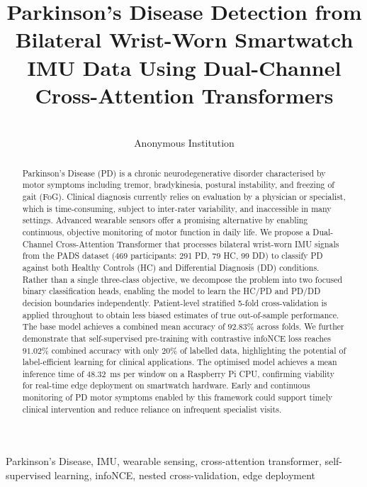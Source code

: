 \documentclass[pmlr]{jmlr}
\title[PD Detection from Bilateral IMU via Cross-Attention Transformers]{%
  Parkinson's Disease Detection from Bilateral Wrist-Worn Smartwatch
  IMU Data Using Dual-Channel Cross-Attention Transformers}
\author{%
  \Name{Anonymous Author(s)} \Email{anonymous@institution.edu}\\
  \addr Anonymous Institution
}
\begin{document}
\maketitle

\begin{abstract}
Parkinson's Disease (PD) is a chronic neurodegenerative disorder
characterised by motor symptoms including tremor, bradykinesia,
postural instability, and freezing of gait (FoG). Clinical diagnosis
currently relies on evaluation by a physician or specialist, which is
time-consuming, subject to inter-rater variability, and inaccessible
in many settings. Advanced wearable sensors offer a promising
alternative by enabling continuous, objective monitoring of motor
function in daily life. We propose a Dual-Channel Cross-Attention
Transformer that processes bilateral wrist-worn IMU signals from the
PADS dataset (469 participants: 291 PD, 79 HC, 99 DD) to classify PD
against both Healthy Controls (HC) and Differential Diagnosis (DD)
conditions. Rather than a single three-class objective, we decompose
the problem into two focused binary classification heads, enabling the
model to learn the HC/PD and PD/DD decision boundaries independently.
Patient-level stratified 5-fold cross-validation is applied throughout
to obtain less biased estimates of true out-of-sample performance. The
base model achieves a combined mean accuracy of $92.83\%$ across
folds. We further demonstrate that self-supervised pre-training with
contrastive infoNCE loss reaches $91.02\%$ combined accuracy with only
$20\%$ of labelled data, highlighting the potential of label-efficient
learning for clinical applications. The optimised model achieves a
mean inference time of $48.32$~ms per window on a Raspberry Pi CPU,
confirming viability for real-time edge deployment on smartwatch
hardware. Early and continuous monitoring of PD motor symptoms enabled
by this framework could support timely clinical intervention and reduce
reliance on infrequent specialist visits.
\end{abstract}

\begin{keywords}
Parkinson's Disease, IMU, wearable sensing, cross-attention transformer,
self-supervised learning, infoNCE, nested cross-validation, edge deployment
\end{keywords}


\end{document}

